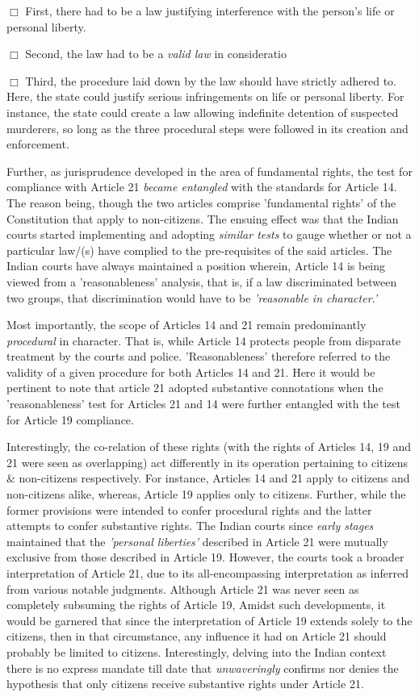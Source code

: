 \begin{multicols}{2}
\noi
$\Box$ First, there had to be a law justifying interference with the person's life or personal liberty.

\noi
$\Box$ Second, the law had to be a \textit{valid law} in consideratio

\noi
$\Box$  Third, the procedure laid down by the law should have strictly adhered to. Here, the state
could justify serious infringements on life or personal liberty. For instance, the state could
create a law allowing indefinite detention of suspected murderers, so long as the three
procedural steps were followed in its creation and enforcement.

\noi
Further, as jurisprudence developed in the area of fundamental rights, the test for compliance
with Article 21 \textit{became entangled} with the standards for Article 14. The reason being, though
the two articles comprise 'fundamental rights' of the Constitution that apply to non-citizens.
The ensuing effect was that the Indian courts started implementing and adopting \textit{similar tests}
to gauge whether or not a particular law/(s) have complied to the pre-requisites of the said
articles. The Indian courts have always maintained a position wherein, Article 14 is being
viewed from a 'reasonableness' analysis, that is, if a law discriminated between two groups,
that discrimination would have to be \textit{'reasonable in character.'}

\noi
Most importantly, the scope of Articles 14 and 21 remain predominantly \textit{procedural} in
character. That is, while Article 14 protects people from disparate treatment by the courts and
police. 'Reasonableness' therefore referred to the validity of a given procedure for both
Articles 14 and 21. Here it would be pertinent to note that article 21 adopted substantive
connotations when the 'reasonableness' test for Articles 21 and 14 were further entangled with
the test for Article 19 compliance.

\noi
Interestingly, the co-relation of these rights (with the rights of Articles 14, 19 and 21 were
seen as overlapping) act differently in its operation pertaining to citizens \& non-citizens
respectively. For instance, Articles 14 and 21 apply to citizens and non-citizens alike, whereas, Article 19 applies only to citizens. Further, while the former provisions were
intended to confer procedural rights and the latter attempts to confer substantive rights.
The Indian courts since \textit{early stages} maintained that the \textit{'personal liberties'} described in
Article 21 were mutually exclusive from those described in Article 19. However, the courts
took a broader interpretation of Article 21, due to its all-encompassing interpretation as
inferred from various notable judgments. Although Article 21 was never seen as completely
subsuming the rights of Article 19, Amidst such developments, it would be garnered that
since the interpretation of Article 19 extends solely to the citizens, then in that circumstance,
any influence it had on Article 21 should probably be limited to citizens. Interestingly,
delving into the Indian context there is no express mandate till date that \textit{unwaveringly}
confirms nor denies the hypothesis that only citizens receive substantive rights under Article
21.


\end{multicols}
